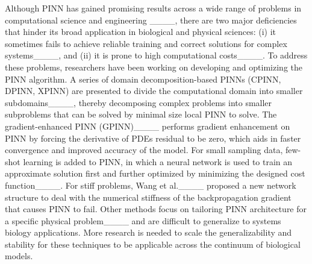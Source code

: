 Although PINN has gained promising results across a wide range of problems in computational science and engineering ____, there are two major deficiencies that hinder its broad application in biological and physical sciences: (i) it sometimes fails to achieve reliable training and correct solutions for complex systems____, and (ii) it is prone to high computational costs____.
To address these problems, researchers have been working on developing and optimizing the PINN algorithm.
A series of domain decomposition-based PINNs (CPINN, DPINN, XPINN) are presented to divide the computational domain into smaller subdomains____, thereby decomposing complex problems into smaller subproblems that can be solved by minimal size local PINN to solve.
The gradient-enhanced PINN (GPINN)____ performs gradient enhancement on PINN by forcing the derivative of PDEs residual to be zero, which aids in faster convergence and improved accuracy of the model.
For small sampling data, few-shot learning is added to PINN, in which a neural network is used to train an approximate solution first and further optimized by minimizing the designed cost function____. 
For stiff problems, Wang et al.____ proposed a new network structure to deal with the numerical stiffness of the backpropagation gradient that causes PINN to fail.
Other methods focus on tailoring PINN architecture for a specific physical problem____ and are difficult to generalize to systems biology applications.
More research is needed to scale the generalizability and stability for these techniques to be applicable across the continuum of biological models.

